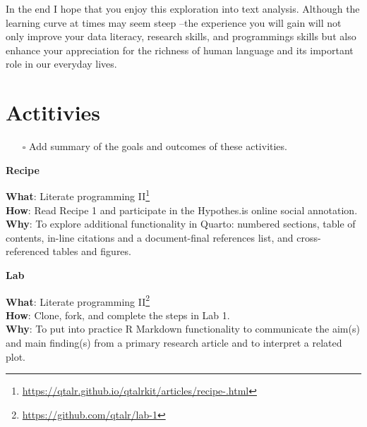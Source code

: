 \documentclass[
  letterpaper,
]{latex/krantz}
\providecommand{\tightlist}{%
  \setlength{\itemsep}{0pt}\setlength{\parskip}{0pt}}\usepackage{longtable,booktabs,array}
\DeclareRobustCommand{\href}[2]{#2\footnote{\url{#1}}}
\begin{document}
In the end I hope that you enjoy this exploration into text analysis.
Although the learning curve at times may seem steep --the experience you
will gain will not only improve your data literacy, research skills, and
programmings skills but also enhance your appreciation for the richness
of human language and its important role in our everyday lives.

\hypertarget{actitivies}{%
\section*{Actitivies}\label{actitivies}}


\begin{itemize}
\tightlist
\item[$\square$]
  Add summary of the goals and outcomes of these activities.
\end{itemize}

\begin{tcolorbox}[enhanced jigsaw, left=2mm, arc=.35mm, colback=white, rightrule=.15mm, toprule=.15mm, breakable, leftrule=.75mm, opacityback=0, bottomrule=.15mm]

\textbf{ Recipe}

\textbf{What}:
\href{https://qtalr.github.io/qtalrkit/articles/recipe-.html}{Literate
programming II}\\
\textbf{How}: Read Recipe 1 and participate in the Hypothes.is online
social annotation.\\
\textbf{Why}: To explore additional functionality in Quarto: numbered
sections, table of contents, in-line citations and a document-final
references list, and cross-referenced tables and figures.

\end{tcolorbox}

\begin{tcolorbox}[enhanced jigsaw, left=2mm, arc=.35mm, colback=white, rightrule=.15mm, toprule=.15mm, breakable, leftrule=.75mm, opacityback=0, bottomrule=.15mm]

\textbf{ Lab}

\textbf{What}: \href{https://github.com/qtalr/lab-1}{Literate
programming II}\\
\textbf{How}: Clone, fork, and complete the steps in Lab 1.\\
\textbf{Why}: To put into practice R Markdown functionality to
communicate the aim(s) and main finding(s) from a primary research
article and to interpret a related plot.

\end{tcolorbox}
\end{document}
